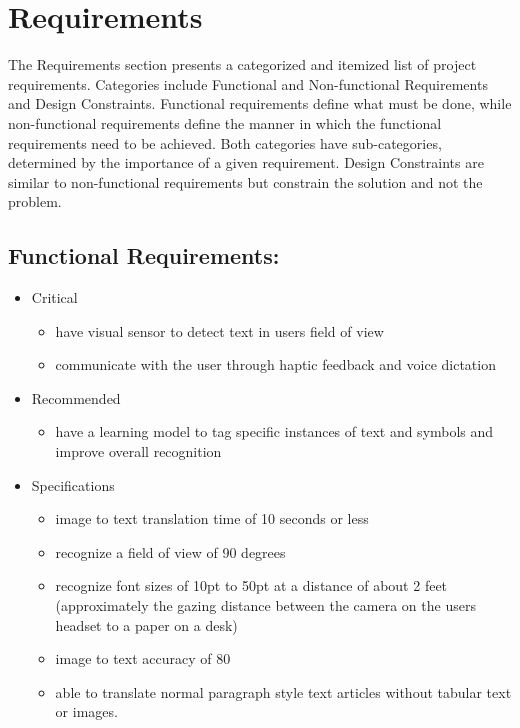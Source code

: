 \chapter{Requirements}
The Requirements section presents a categorized and itemized list of project requirements. Categories include Functional and Non-functional Requirements and Design Constraints. Functional requirements define what must be done, while non-functional requirements define the manner in which the functional requirements need to be achieved. Both categories have sub-categories, determined by the importance of a given requirement. Design Constraints are similar to non-functional requirements but constrain the solution and not the problem.
\section{Functional Requirements:}
\begin{itemize}
\item Critical
	\begin{itemize}
	\item have visual sensor to detect text in users field of view
	\item communicate with the user through haptic feedback and voice dictation
    \end{itemize}
\item Recommended
	\begin{itemize}
	\item have a learning model to tag specific instances of text and symbols and improve overall recognition
	\end{itemize}
\item Specifications
	\begin{itemize}
	\item image to text translation time of 10 seconds or less
	\item recognize a field of view of 90 degrees
	\item recognize font sizes of 10pt to 50pt at a distance of about 2 feet (approximately the gazing distance between the camera
	on the users headset to a paper on a desk)
	\item image to text accuracy of 80%
	\item able to translate normal paragraph style text articles without tabular text or images. 
	\end{itemize}
\end{itemize}

\pagebreak


